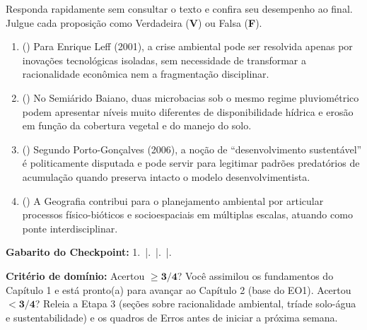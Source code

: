 \begin{boxTeste}
Responda rapidamente sem consultar o texto e confira seu desempenho ao final. Julgue cada proposição como Verdadeira (\textbf{V}) ou Falsa (\textbf{F}).
\begin{enumerate}[leftmargin=1.8em, itemsep=3pt]
  \item (\quad) Para Enrique Leff (2001), a crise ambiental pode ser resolvida apenas por inovações tecnológicas isoladas, sem necessidade de transformar a racionalidade econômica nem a fragmentação disciplinar.
  \item (\quad) No Semiárido Baiano, duas microbacias sob o mesmo regime pluviométrico podem apresentar níveis muito diferentes de disponibilidade hídrica e erosão em função da cobertura vegetal e do manejo do solo.
  \item (\quad) Segundo Porto-Gonçalves (2006), a noção de ``desenvolvimento sustentável'' é politicamente disputada e pode servir para legitimar padrões predatórios de acumulação quando preserva intacto o modelo desenvolvimentista.
  \item (\quad) A Geografia contribui para o planejamento ambiental por articular processos físico-bióticos e socioespaciais em múltiplas escalas, atuando como ponte interdisciplinar.
\end{enumerate}

\vspace{4pt}
\textbf{Gabarito do Checkpoint:} 1.~\F \quad|.~\V \quad|.~\V \quad|.~\V

\textbf{Critério de domínio:} Acertou $\mathbf{\ge 3/4}$? Você assimilou os fundamentos do Capítulo 1 e está pronto(a) para avançar ao Capítulo 2 (base do EO1). Acertou $\mathbf{< 3/4}$? Releia a Etapa 3 (seções sobre racionalidade ambiental, tríade solo-água e sustentabilidade) e os quadros de Erros antes de iniciar a próxima semana.
\end{boxTeste}
